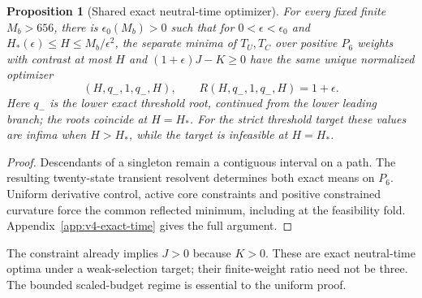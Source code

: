 \documentclass[aps,pre,reprint,amsmath,amssymb,longbibliography]{revtex4-2}
\newtheorem{proposition}[theorem]{Proposition}
\begin{document}
\begin{proposition}[Shared exact neutral-time optimizer]
\label{prop:v4-exact-time}
For every fixed finite $M_b>656$, there is $\epsilon_0(M_b)>0$
such that for $0<\epsilon<\epsilon_0$ and
$H_*(\epsilon)\le H\le M_b/\epsilon^2$, the separate minima of
$T_U,T_C$ over positive $P_6$ weights with contrast at most $H$ and
$(1+\epsilon)J-K\ge0$ have the same unique normalized optimizer
\begin{equation}
 (H,q_-,1,q_-,H),\qquad R(H,q_-,1,q_-,H)=1+\epsilon.
 \label{eq:v4-exact-time}
\end{equation}
Here $q_-$ is the lower exact threshold root, continued from the lower
leading branch; the roots coincide at $H=H_*$. For the strict threshold
target these values are infima when $H>H_*$, while the target is
infeasible at $H=H_*$.
\end{proposition}
\begin{proof}
Descendants of a singleton remain a contiguous
interval on a path. The resulting twenty-state transient resolvent
determines both exact means on $P_6$. Uniform derivative control,
active core constraints and positive constrained curvature force the
common reflected minimum, including at the feasibility fold.
Appendix~\ref{app:v4-exact-time} gives the full argument.
\end{proof}

The constraint already implies $J>0$ because $K>0$. These are exact
neutral-time optima under a weak-selection target; their finite-weight
ratio need not be three. The bounded scaled-budget regime is essential
to the uniform proof.
\end{document}
